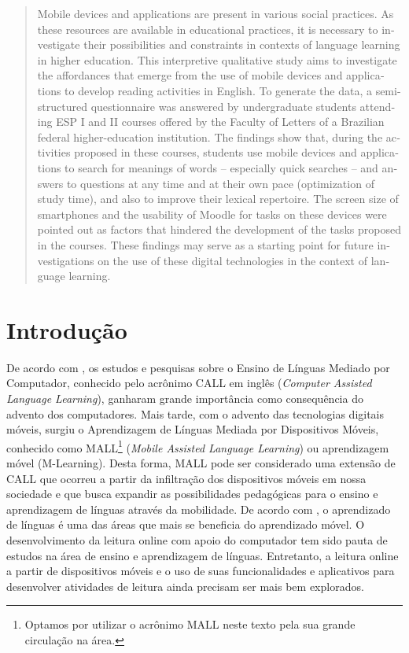 \documentclass[portuguese]{textolivre}
\begin{document}
\begin{polyabstract}
\begin{english}
\begin{abstract}
Mobile devices and applications are present in various social practices. As these resources are available in educational practices, it is necessary to investigate their possibilities and constraints in contexts of language learning in higher education. This interpretive qualitative study aims to investigate the affordances that emerge  from the use of mobile devices and applications to develop reading activities in English. To generate the data, a semi-structured questionnaire was answered by  undergraduate students attending ESP I and II courses offered by the Faculty of Letters of a Brazilian federal higher-education institution. The findings show that, during the activities proposed in these courses, students use mobile devices and applications to search for meanings of words -- especially quick searches -- and answers to questions at any time and at their own pace (optimization of study time), and also to improve their lexical repertoire. The screen size of smartphones and the usability of Moodle for tasks on these devices were pointed out as factors that hindered the development of the tasks proposed in the courses. These findings may serve as a starting point for future investigations on the use of these digital technologies in the context of language learning.

\end{abstract}
\end{english}
\end{polyabstract}

\section{Introdução}
De acordo com \textcite{bragaand2017call}, os estudos e pesquisas sobre o Ensino de Línguas Mediado por Computador, conhecido pelo acrônimo CALL em inglês (\emph{Computer Assisted Language Learning}), ganharam grande importância como consequência do advento dos computadores. Mais tarde, com o advento das tecnologias digitais móveis, surgiu o Aprendizagem de Línguas Mediada por Dispositivos Móveis, conhecido como MALL\footnote{Optamos por utilizar o acrônimo MALL neste texto pela sua grande circulação na área.} (\emph{Mobile Assisted Language Learning}) ou aprendizagem móvel (M-Learning). Desta forma, MALL pode ser considerado uma extensão de CALL que ocorreu a partir da infiltração dos dispositivos móveis em nossa sociedade e que busca expandir as possibilidades pedagógicas para o ensino e aprendizagem de línguas através da mobilidade. De acordo com \textcite{kukulska2015language}, o aprendizado de línguas é uma das áreas que mais se beneficia do aprendizado móvel. O desenvolvimento da leitura online com apoio do computador tem sido pauta de estudos na área de ensino e aprendizagem de línguas. Entretanto, a leitura online a partir de dispositivos móveis e o uso de suas funcionalidades e aplicativos para desenvolver atividades de leitura ainda precisam ser mais bem explorados.
\end{document}
